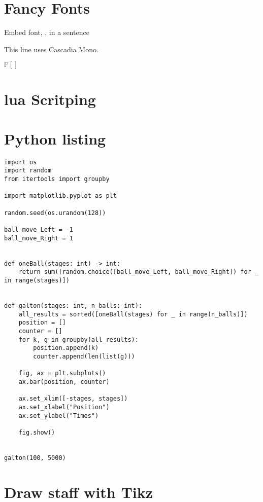 \documentclass[12pt,a4paper]{article}
\begin{document}
\section{Fancy Fonts}

Embed font, , in a sentence

This line uses { Cascadia Mono.}

$\mathbb{P}[]$

\section{lua Scritping}



\section{Python listing}

\begin{lstlisting}
import os
import random
from itertools import groupby

import matplotlib.pyplot as plt

random.seed(os.urandom(128))

ball_move_Left = -1
ball_move_Right = 1


def oneBall(stages: int) -> int:
    return sum([random.choice([ball_move_Left, ball_move_Right]) for _ in range(stages)])


def galton(stages: int, n_balls: int):
    all_results = sorted([oneBall(stages) for _ in range(n_balls)])
    position = []
    counter = []
    for k, g in groupby(all_results):
        position.append(k)
        counter.append(len(list(g)))

    fig, ax = plt.subplots()
    ax.bar(position, counter)

    ax.set_xlim([-stages, stages])
    ax.set_xlabel("Position")
    ax.set_ylabel("Times")

    fig.show()


galton(100, 5000)
\end{lstlisting}

\section{Draw staff with Tikz}
\end{document}
